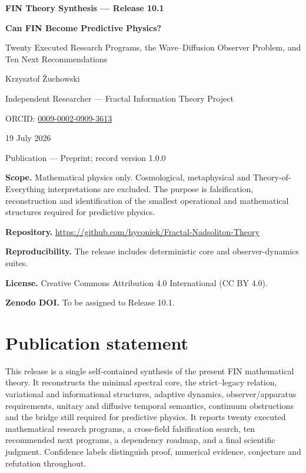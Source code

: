 \documentclass[11pt,a4paper,openany]{report}
\begin{document}
\hypersetup{pageanchor=false}
\begin{titlepage}
\centering
\vspace*{15mm}
{\Large\bfseries FIN Theory Synthesis — Release 10.1\par}
\vspace{12mm}
{\Huge\bfseries Can FIN Become Predictive Physics?\par}
\vspace{6mm}
{\Large Twenty Executed Research Programs, the Wave--Diffusion Observer Problem, and Ten Next Recommendations\par}
\vspace{18mm}
{\Large Krzysztof Żuchowski\par}
\vspace{2mm}
{\normalsize Independent Researcher --- Fractal Information Theory Project\par}
\vspace{2mm}
{\normalsize ORCID: \href{https://orcid.org/0009-0002-0909-3613}{0009-0002-0909-3613}\par}
\vspace{10mm}
{\large 19 July 2026\par}
{\normalsize Publication --- Preprint; record version 1.0.0\par}
\vfill
\begin{minipage}{0.88\textwidth}
\small
\textbf{Scope.} Mathematical physics only. Cosmological, metaphysical and Theory-of-Everything interpretations are excluded. The purpose is falsification, reconstruction and identification of the smallest operational and mathematical structures required for predictive physics.

\medskip
\textbf{Repository.} \url{https://github.com/hyconiek/Fractal-Nadsoliton-Theory}

\textbf{Reproducibility.} The release includes deterministic core and observer-dynamics suites.

\textbf{License.} Creative Commons Attribution 4.0 International (CC BY 4.0).

\textbf{Zenodo DOI.} To be assigned to Release 10.1.
\end{minipage}
\vfill
\end{titlepage}
\hypersetup{pageanchor=true}

\chapter*{Publication statement}
This release is a single self-contained synthesis of the present FIN mathematical theory. It reconstructs the minimal spectral core, the strict--legacy relation, variational and informational structures, adaptive dynamics, observer/apparatus requirements, unitary and diffusive temporal semantics, continuum obstructions and the bridge still required for predictive physics. It reports twenty executed mathematical research programs, a cross-field falsification search, ten recommended next programs, a dependency roadmap, and a final scientific judgment. Confidence labels distinguish proof, numerical evidence, conjecture and refutation throughout.
\end{document}
